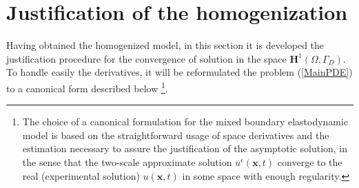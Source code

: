 \section{Justification of the homogenization}
Having obtained the homogenized model, in this section it is developed the justification procedure for the convergence of solution in the space $\mathbf{H}^1(\Omega, \Gamma_D)$. To handle easily the derivatives, it will be reformulated the problem (\ref{MainPDE}) to a canonical form described below \footnote{The choice of a canonical formulation for the mixed boundary elastodynamic model is based on the straightforward usage of space derivatives and the estimation necessary to assure the justification of the asymptotic solution, in the sense that the two-scale approximate solution $u^{\epsilon}(\mathbf{x},t)$ converge to the real (experimental solution) $u(\mathbf{x},t)$ in some space with enough regularity.}.

